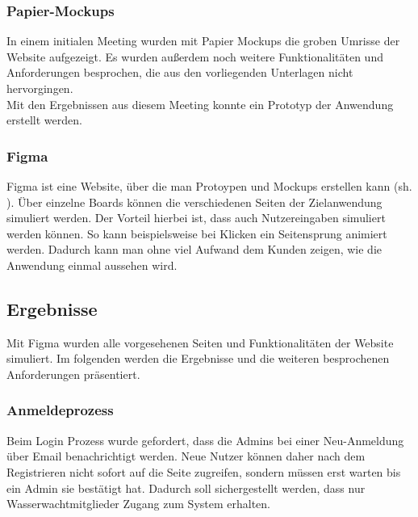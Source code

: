 \documentclass[fontsize=12pt,openright,oneside,paper=a4,BCOR=1cm]{scrbook}
\begin{document}
\subsubsection{Papier-Mockups}
In einem initialen Meeting wurden mit Papier Mockups die groben Umrisse der Website aufgezeigt. Es wurden außerdem noch weitere Funktionalitäten und Anforderungen besprochen, die aus den vorliegenden Unterlagen nicht hervorgingen. \\
Mit den Ergebnissen aus diesem Meeting konnte ein Prototyp der Anwendung erstellt werden.


\subsubsection{Figma}
Figma ist eine Website, über die man Protoypen und Mockups erstellen kann (sh. \cite{figma}). Über einzelne Boards können die verschiedenen Seiten der Zielanwendung simuliert werden. Der Vorteil hierbei ist, dass auch Nutzereingaben simuliert werden können. So kann beispielsweise bei Klicken ein Seitensprung animiert werden. Dadurch kann man ohne viel Aufwand dem Kunden zeigen, wie die Anwendung einmal aussehen wird. 

\subsection{Ergebnisse}
Mit Figma wurden alle vorgesehenen Seiten und Funktionalitäten der Website simuliert. Im folgenden werden die Ergebnisse und die weiteren besprochenen Anforderungen präsentiert. 

\subsubsection{Anmeldeprozess}
Beim Login Prozess wurde gefordert, dass die \glqq Admins\grqq{} bei einer Neu-Anmeldung über Email benachrichtigt werden. Neue Nutzer können daher nach dem Registrieren nicht sofort auf die Seite zugreifen, sondern müssen erst warten bis ein Admin sie bestätigt hat. Dadurch soll sichergestellt werden, dass nur Wasserwachtmitglieder Zugang zum System erhalten.
\end{document}
